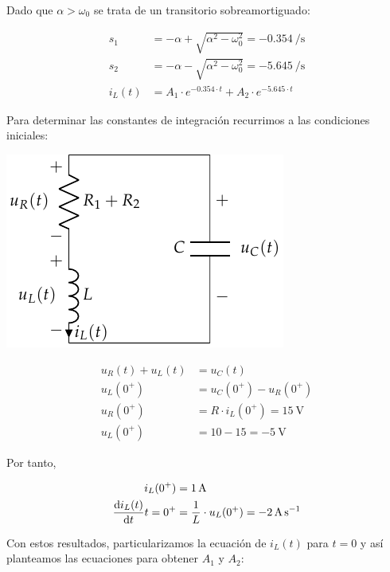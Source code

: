 \documentclass[12pt]{article}
\begin{document}
\bigskip

Dado que $\alpha > \omega_0$ se trata de un transitorio
sobreamortiguado:

\begin{align*}
  s_1 &= -\alpha + \sqrt{\alpha^2 - \omega_0^2} = \SI{-0.354}{\per\second}\\
  s_2 &= -\alpha - \sqrt{\alpha^2 - \omega_0^2} = \SI{-5.645}{\per\second}\\
  i_L(t) &= A_1 \cdot e^{-0.354 \cdot t} + A_2 \cdot e^{-5.645 \cdot t}
\end{align*}

Para determinar las constantes de integración recurrimos a las
condiciones iniciales:

\bigskip

\begin{minipage}{0.3\textwidth}
  \includegraphics[scale=0.8]{figs/FM_4_8_natural}
\end{minipage}
\begin{minipage}{0.7\textwidth}
  \begin{align*}
    u_R(t) + u_L(t) &= u_C(t)\\
    u_L(0^+) &= u_C(0^+) - u_R(0^+)\\
    u_R(0^+) &= R \cdot i_L(0^+) = \SI{15}{\volt}\\
    u_L(0^+) &= 10 - 15 = \SI{-5}{\volt}
  \end{align*}
\end{minipage}

\bigskip

Por tanto,

\begin{align*}
  i_L(0^+) &= \SI{1}{\ampere}\\
  \diff{i_L(t)}{t}{t = 0^+} &= \frac{1}{L} \cdot u_L(0^+) = \SI{-2}{\ampere\per\second}
\end{align*}

Con estos resultados, particularizamos la ecuación de $i_L(t)$ para
$t = 0$ y así planteamos las ecuaciones para obtener $A_1$ y $A_2$:
\end{document}
